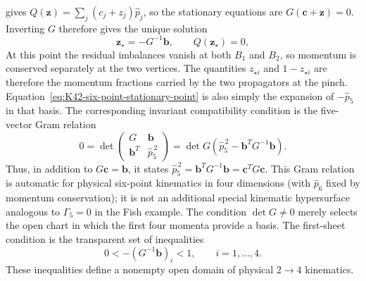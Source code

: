 \documentclass[a4paper,11pt]{article}
\begin{document}
gives
\(Q(\boldsymbol z)=\sum_j(c_j+z_j)\widehat p_j\), so the stationary equations
are \(G(\boldsymbol c+\boldsymbol z)=0\).  Inverting \(G\) therefore gives the
unique solution
\begin{equation}
 \boldsymbol z_\star=-G^{-1}\boldsymbol b,\qquad
 Q(\boldsymbol z_\star)=0,
 \label{eq:K42-six-point-stationary-point}
\end{equation}
At this point the residual imbalances vanish at both \(B_1\) and \(B_2\), so
momentum is conserved separately at the two vertices.  The quantities \(z_{\star i}\) and
\(1-z_{\star i}\) are therefore the momentum fractions carried by the two
propagators at the pinch.  Equation~\eqref{eq:K42-six-point-stationary-point}
is also simply the expansion of \(-\widehat p_5\) in that basis.  The
corresponding invariant compatibility condition is the five-vector Gram
relation
\[
 0=\det\!\begin{pmatrix}
 G & \boldsymbol b\\
 \boldsymbol b^{T} & \widehat p_5^{\,2}
 \end{pmatrix}
 =\det G\left(\widehat p_5^{\,2}
   -\boldsymbol b^{T}G^{-1}\boldsymbol b\right).
\]
Thus, in addition to \(G\boldsymbol c=\boldsymbol b\), it states
\(\widehat p_5^{\,2}=\boldsymbol b^{T}G^{-1}\boldsymbol b
=\boldsymbol c^{T}G\boldsymbol c\).  This Gram relation is automatic for
physical six-point kinematics in four dimensions (with
\(\widehat p_6\) fixed by momentum conservation); it is not an additional
special kinematic hypersurface analogous to \(\Gamma_5=0\) in the Fish
example.  The condition \(\det G\ne0\) merely selects the open chart in
which the first four momenta provide a basis.  The first-sheet condition is
the transparent set of inequalities
\begin{equation}
 0<-(G^{-1}\boldsymbol b)_i<1,\qquad i=1,\ldots,4.
 \label{eq:K42-six-point-positivity}
\end{equation}
These inequalities define a nonempty open domain of physical \(2\to4\)
kinematics.
\end{document}
